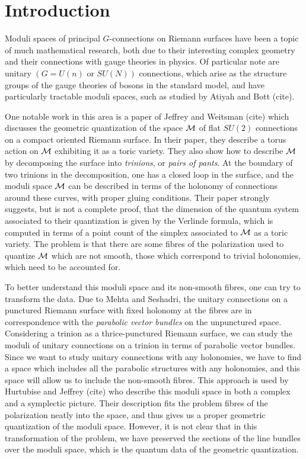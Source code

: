 \section{Introduction}
\label{s:intro}

	Moduli spaces of principal $G$-connections on Riemann surfaces have been a topic of much mathematical research, both due to their interesting complex geometry and their connections with gauge theories in physics. Of particular note are unitary $(G=U(n) \text{ or }SU(N))$ connections, which arise as the structure groups of the gauge theories of bosons in the standard model, and have particularly tractable moduli spaces, such as studied by Atiyah and Bott (cite). 
	
	One notable work in this area is a paper of Jeffrey and Weitsman (cite) which discusses the geometric quantization of the space $\mathcal{M}$ of flat $SU(2)$ connections on a compact oriented Riemann surface. In their paper, they describe a torus action on $\mathcal{M}$ exhibiting it as a toric variety. They also show how to describe $\mathcal{M}$ by decomposing the surface into \textit{trinions}, or \textit{pairs of pants}. At the boundary of two trinions in the decomposition, one has a closed loop in the surface, and the moduli space $\mathcal{M}$ can be described in terms of the holonomy of connections around these curves, with proper gluing conditions. Their paper strongly suggests, but is not a complete proof, that the dimension of the quantum system associated to their quantization is given by the Verlinde formula, which is computed in terms of a point count of the simplex associated to $\mathcal{M}$ as a toric variety. The problem is that there are some fibres of the polarization used to quantize $\mathcal{M}$ which are not smooth, those which correspond to trivial holonomies, which need to be accounted for.
	
	To better understand this moduli space and its non-smooth fibres, one can try to transform the data. Due to Mehta and Seshadri, the unitary connections on a punctured Riemann surface with fixed holonomy at the fibres are in correspondence with the \textit{parabolic vector bundles} on the unpunctured space. Considering a trinion as a thrice-punctured Riemann surface, we can study the moduli of unitary connections on a trinion in terms of parabolic vector bundles. Since we want to study unitary connections with any holonomies, we have to find a space which includes all the parabolic structures with any holonomies, and this space will allow us to include the non-smooth fibres. This approach is used by Hurtubise and Jeffrey (cite) who describe this moduli space in both a complex and a symplectic picture. Their description fits the problem fibres of the polarization neatly into the space, and thus gives us a proper geometric quantization of the moduli space. However, it is not clear that in this transformation of the problem, we have preserved the sections of the line bundles over the moduli space, which is the quantum data of the geometric quantization.
	
